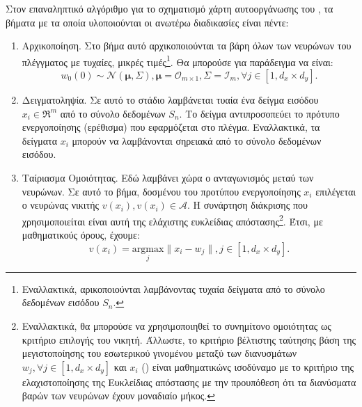 Στον επαναληπτικό αλγόριθμο για το σχηματισμό χάρτη αυτο\textendash οργάνωσης του , τα βήματα με τα οποία υλοποιούνται οι ανωτέρω διαδικασίες είναι πέντε:
\begin{enumerate}
  \item Αρχικοποίηση. Στο βήμα αυτό αρχικοποιούνται τα βάρη όλων των νευρώνων του πλέγγματος με τυχαίες, μικρές τιμές\footnote{Εναλλακτικά, αρικοποιούνται λαμβάνοντας τυχαία δείγματα από το σύνολο δεδομένων εισόδου $S_n$.}. Θα μπορούσε για παράδειγμα να είναι:
  \begin{equation}
    w_0(0) \sim \mathcal{N}(\boldsymbol{\mu},\boldsymbol{\varSigma}), \boldsymbol{\mu} = \mathcal{O}_{m\times 1} , \boldsymbol{\varSigma} = \mathcal{I}_m, \forall j \in [1, d_x \times d_y].
  \end{equation}

  \item Δειγματοληψία. Σε αυτό το στάδιο λαμβάνεται τυαία ένα δείγμα εισόδου $x_i \in \Re^m$ από το σύνολο δεδομένων $S_n$. Το δείγμα αντιπροσοπεύει το πρότυπο ενεργοποίησης (ερέθισμα) που εφαρμόζεται στο πλέγμα. Εναλλακτικά, τα δείγματα $x_i$ μπορούν να λαμβάνονται σηρειακά από το σύνολο δεδομένων εισόδου.
  
  \item Ταίριασμα Ομοιότητας. Εδώ λαμβάνει χώρα ο ανταγωνισμός μεταύ των νευρώνων. Σε αυτό το βήμα, δοσμένου του προτύπου ενεργοποίησης $x_i$ επιλέγεται ο νευρώνας νικιτής $v(x_i), v(x_i) \in \mathcal{A} $. Η συνάρτηση διάκρισης που χρησιμοποιείται είναι αυτή της ελάχιστης ευκλείδιας απόστασης\footnote{Εναλλακτικά, θα μπορούσε να χρησιμοποιηθεί το συνημίτονο ομοιότητας ως κριτήριο επιλογής του νικητή. Άλλωστε, το κριτήριο βέλτιστης ταύτησης βάση της μεγιστοποίησης του εσωτερικού γινομένου μεταξύ των διανυσμάτων $w_j, \forall j \in [1, d_x \times d_y]$ και $x_i$ () είναι μαθηματικώνς ισοδύναμο με το κριτήριο της ελαχιστοποίησης της Ευκλείδιας απόστασης με την προυπόθεση ότι τα διανύσματα βαρών των νευρώνων έχουν μοναδιαίο μήκος\cite{haykin2009neural}.}. Έτσι, με μαθηματικούς όρους, έχουμε:
  \begin{equation}
    v(x_i) = \underset{j}{\mathrm{argmax}} \lVert x_i - w_j \rVert , j \in [1, d_x \times d_y].
  \end{equation}


\end{enumerate}
